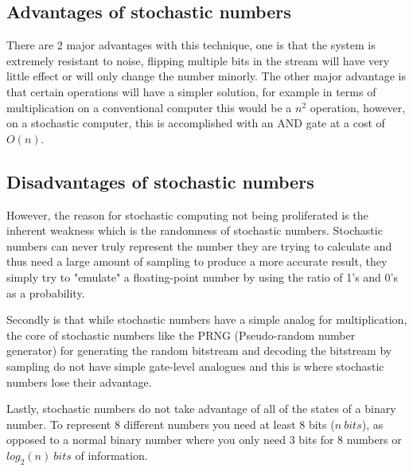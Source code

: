 \documentclass[a4paper,oneside,phd,etd]{BYUPhys}
\begin{document}
\subsection{Advantages of stochastic numbers}
There are 2 major advantages with this technique, one is that the system is extremely resistant to noise\cite{8122049}, flipping multiple bits in the stream will have very little effect or will only change the number minorly. The other major advantage is that certain operations will have a simpler solution, for example in terms of multiplication on a conventional computer this would be a $n^2$ operation, however, on a stochastic computer, this is accomplished with an AND gate at a cost of $O(n)$.

\subsection{Disadvantages of stochastic numbers}
However, the reason for stochastic computing not being proliferated is the inherent weakness which is the randomness of stochastic numbers. Stochastic numbers can never truly represent the number they are trying to calculate and thus need a large amount of sampling to produce a more accurate result, they simply try to "emulate" a floating-point number by using the ratio of 1's and 0's as a probability.

Secondly is that while stochastic numbers have a simple analog for multiplication, the core of stochastic numbers like the PRNG (Pseudo-random number generator) for generating the random bitstream and decoding the bitstream by sampling do not have simple gate-level analogues and this is where stochastic numbers lose their advantage.

Lastly, stochastic numbers do not take advantage of all of the states of a binary number. To represent 8 different numbers you need at least 8 bits ($n\ bits$), as opposed to a normal binary number where you only need 3 bits for 8 numbers or $log_2(n)\ bits$ of information.

\end{document}
